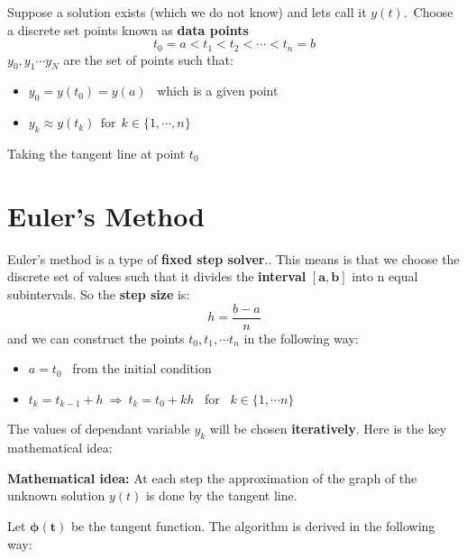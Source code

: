 \documentclass[11pt,a4paper]{amsart}
\begin{document}
	Suppose a solution exists (which we do not know) and lets call it $y(t)$.\
	Choose a discrete set points known as {\bf data points} 
	$$t_0 = a < t_1 < t_2 < \cdots < t_{n} = b$$
	$y_0, y_1 \cdots y_N$ are the set of points such that:
	\begin{itemize}
		\item $y_0 = y(t_0) = y(a)$ \ which is a given point
		\item $y_k \approx y(t_k) \ \ \text{for} \ \ k \in \{1, \cdots ,n\}$
	\end{itemize}
	
	Taking the tangent line at point $t_0$
	
	\clearpage
	\section{Euler's Method} 
	Euler's method is a type of {\bf fixed step solver}.\cite{polking}. This means is that we choose the discrete set of values such that it divides the \textbf{interval} $\boldsymbol{[a,b]}$ into n equal subintervals. 
	So the {\bf step size} is: 
	$$h = \frac{b-a}{n}$$
	and we can construct the points $t_0, t_1, \cdots t_n$ in the following way:
	\begin{itemize}
		\item $a = t_0$ \ from the initial condition
		\item $t_k = t_{k-1} + h \ \Rightarrow \ t_k =  t_0 + kh$ \ for \ $k \in \{1, \cdots n\}$
	\end{itemize}
	\vspace{2px}
	The values of dependant variable $y_k$ will be chosen {\bf iteratively}. Here is the key mathematical idea:
	
	\begin{tcolorbox}
		\textbf{Mathematical idea:} At each step the approximation of the graph of the unknown solution $y(t)$ is done by the tangent line.
	\end{tcolorbox}

	Let $\boldsymbol{\phi(t)}$ be the tangent function. The algorithm is derived in the following way:
	
\end{document}
